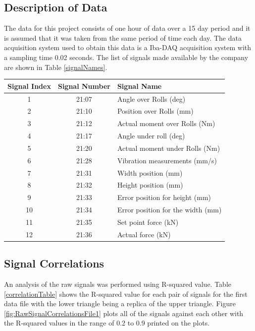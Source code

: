 \documentclass{article}
\begin{document}
\subsection{Description of Data}
The data for this project consists of one hour of data over a 15 day period and it is assumed that it was taken from the same period of time each day. The data acquisition system used to obtain this data is a Iba-DAQ acquisition system with a sampling time 0.02 seconds. The list of signals made available by the company are shown in Table \ref{signalNames}.
\begin{center}
\begin{tabular}{ |c|c|l| }
 \hline
Signal Index & Signal Number & Signal Name \\ 
 \hline
1 & 21:07 & Angle over Rolls (deg) \\
 \hline
2 & 21:10 & Position over Rolls (mm) \\
 \hline
3 & 21:12 & Actual moment over Rolls (Nm) \\
 \hline
4 & 21:17 & Angle under roll (deg) \\
 \hline
5 & 21:20 & Actual moment under Rolls (Nm) \\
 \hline
6 & 21:28 & Vibration measurements (mm/s) \\ 
 \hline              
7 & 21:31 & Width position (mm) \\
 \hline
8 & 21:32 & Height position (mm) \\
 \hline
9 & 21:33 & Error position for height (mm) \\
 \hline
10 & 21:34 & Error position for the width (mm) \\
 \hline
11 & 21:35 & Set point force (kN) \\
 \hline
12 & 21:36 & Actual force (kN) \\
 \hline
\end{tabular}
\label{signalNames}
\end{center}

\subsection{Signal Correlations}
An analysis of the raw signals was performed using R-squared value. Table \ref{correlationTable} shows the R-squared value for each pair of signals for the first data file with the lower triangle being a replica of the upper triangle. Figure \ref{fig:RawSignalCorrelationsFile1} plots all of the signals against each other with the R-squared values in the range of 0.2 to 0.9 printed on the plots. 
\begin{center}
    
\label{correlationTable}
\end{center}
\end{document}
